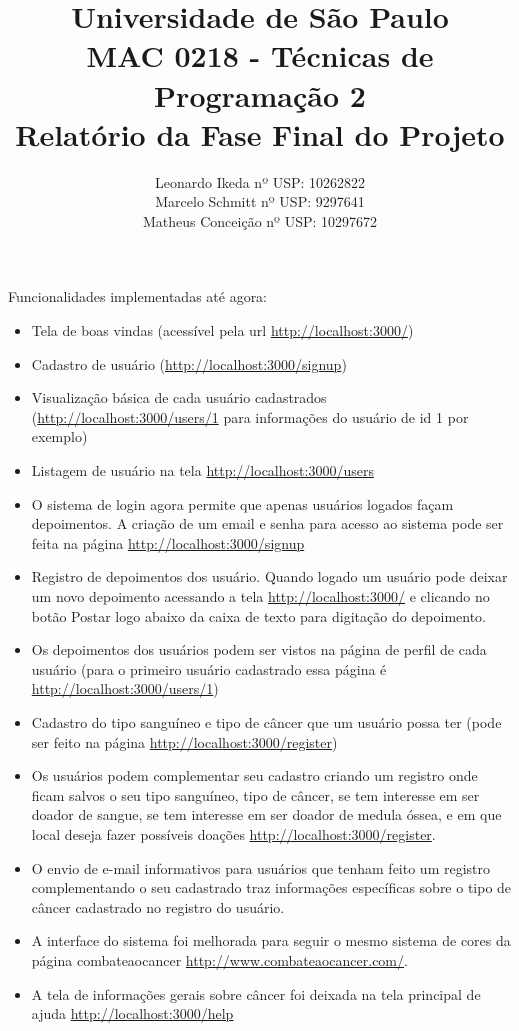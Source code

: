 \documentclass[12pt,a4paper]{article}
\title{{\bf Universidade de São Paulo} \\MAC 0218 - Técnicas de Programação 2 \\ Relatório da Fase Final do Projeto}
\author{Leonardo Ikeda     nº USP: 10262822 \\
	    Marcelo Schmitt    nº USP: 9297641\\
	    Matheus Conceição  nº USP: 10297672}
\begin{document}
\date{}
\maketitle


\noindent Funcionalidades implementadas até agora:
\begin{itemize}
	\item Tela de boas vindas (acessível pela url \url{http://localhost:3000/})
	\item Cadastro de usuário (\url{http://localhost:3000/signup})
	\item Visualização básica de cada usuário cadastrados (\url{http://localhost:3000/users/1} para informações do usuário de id 1 por exemplo)
	\item Listagem de usuário na tela \url{http://localhost:3000/users}
	\item O sistema de login agora permite que apenas usuários logados façam depoimentos. A criação de um email e senha para acesso ao sistema pode ser feita na página \url{http://localhost:3000/signup}
	\item Registro de depoimentos dos usuário. Quando logado um usuário pode deixar um novo depoimento acessando a tela \url{http://localhost:3000/} e clicando no botão Postar logo abaixo da caixa de texto para digitação do depoimento.
	\item Os depoimentos dos usuários podem ser vistos na página de perfil de cada usuário (para o primeiro usuário cadastrado essa página é \url{http://localhost:3000/users/1})
	\item Cadastro do tipo sanguíneo e tipo de câncer que um usuário possa ter (pode ser feito na página \url{http://localhost:3000/register})
	\item Os usuários podem complementar seu cadastro criando um registro onde ficam salvos o seu tipo sanguíneo, tipo de câncer, se tem interesse em ser doador de sangue, se tem interesse em ser doador de medula óssea, e em que local deseja fazer possíveis doações \url{http://localhost:3000/register}.
	\item O envio de e-mail informativos para usuários que tenham feito um registro complementando o seu cadastrado traz informações específicas sobre o tipo de câncer cadastrado no registro do usuário.
	\item A interface do sistema foi melhorada para seguir o mesmo sistema de cores da página combateaocancer \url{http://www.combateaocancer.com/}.
	\item A tela de informações gerais sobre câncer foi deixada na tela principal de ajuda \url{http://localhost:3000/help}

\end{itemize}
\end{document}
